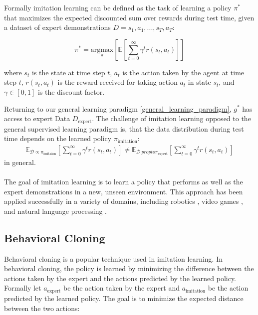 Formally imitation learning can be defined as the task of learning a policy $\pi^*$ that maximizes the expected discounted sum over rewards during test time, given a dataset of expert demonstrations $D = {s_1, a_1, ..., s_T, a_T}$:

\begin{equation}
    \pi^* = \underset{\pi}{\text{argmax}}\left[\mathbb{E} [\sum_{t=0}^{\infty} \gamma^t r(s_t, a_t)]\right]
\end{equation}

where $s_t$ is the state at time step $t$, $a_t$ is the action taken by the agent at time step $t$, $r(s_t, a_t)$ is the reward received for taking action $a_t$ in state $s_t$, and $\gamma \in [0,1]$ is the discount factor.

Returning to our general learning paradigm \ref{general_learning_paradigm}, $g^*$ has access to expert Data $D_{\text{expert}}$. 
The challenge of imitation learning 
opposed to the general supervised learning paradigm is, that the data distribution during test time depends on the learned policy $\pi_{\text{imitation}}$:
\begin{align}
    \mathbb{E}_{\mathcal{D} \propto \pi_{\text{imitaion}}}[\sum_{t=0}^{\infty} \gamma^t r(s_t, a_t)] \neq \mathbb{E}_{\mathcal{D} \ propto \pi_{\text{expert}}}[\sum_{t=0}^{\infty} \gamma^t r(s_t, a_t)]
\end{align}
in general.
\\ \\
The goal of imitation learning is to learn a policy that performs as well as the expert demonstrations in a new, unseen environment. 
This approach has been applied successfully in a variety of domains, including robotics \cite{stepputtis2020languageconditioned}, video games \cite{MUZero}, 
and natural language processing \cite{brown2020language}.

\subsection{Behavioral Cloning}
Behavioral cloning is a popular technique used in imitation learning. 
In behavioral cloning, the policy is learned by minimizing the difference between the actions taken by the expert and the 
actions predicted by the learned policy. Formally let $a_{\text{expert}}$ be the action taken by the expert and $a_{\text{imitation}}$ be the action 
predicted by the learned policy. The goal is to minimize the expected distance between the two actions:


